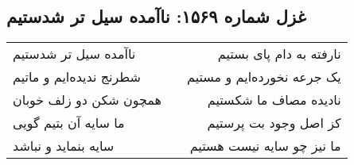 \begin{center}
\section*{غزل شماره ۱۵۶۹: ناآمده سیل تر شدستیم}
\label{sec:1569}
\begin{longtable}{l p{0.5cm} r}
ناآمده سیل تر شدستیم
&&
نارفته به دام پای بستیم
\\
شطرنج ندیده‌ایم و ماتیم
&&
یک جرعه نخورده‌ایم و مستیم
\\
همچون شکن دو زلف خوبان
&&
نادیده مصاف ما شکستیم
\\
ما سایه آن بتیم گویی
&&
کز اصل وجود بت پرستیم
\\
سایه بنماید و نباشد
&&
ما نیز چو سایه نیست هستیم
\\
\end{longtable}
\end{center}
